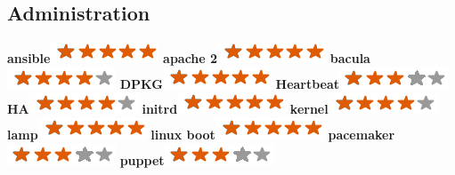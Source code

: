 \documentclass[]{friggeri-cv}
\begin{document}
\begin{aside}
    \section{Administration}
        \textbf{ansible}\includegraphics[scale=0.40]{img/5stars.png}
        \textbf{apache 2}\includegraphics[scale=0.40]{img/5stars.png}
        \textbf{bacula}\includegraphics[scale=0.40]{img/4stars.png}
        \textbf{DPKG}\includegraphics[scale=0.40]{img/5stars.png}
        \textbf{Heartbeat}\includegraphics[scale=0.40]{img/3stars.png}
        \textbf{HA}\includegraphics[scale=0.40]{img/4stars.png}
        \textbf{initrd}\includegraphics[scale=0.40]{img/5stars.png}
        \textbf{kernel}\includegraphics[scale=0.40]{img/4stars.png}
        \textbf{lamp}\includegraphics[scale=0.40]{img/5stars.png}
        \textbf{linux boot}\includegraphics[scale=0.40]{img/5stars.png}
        \textbf{pacemaker}\includegraphics[scale=0.40]{img/3stars.png}
        \textbf{puppet}\includegraphics[scale=0.40]{img/3stars.png}

\end{aside}
\end{document}
